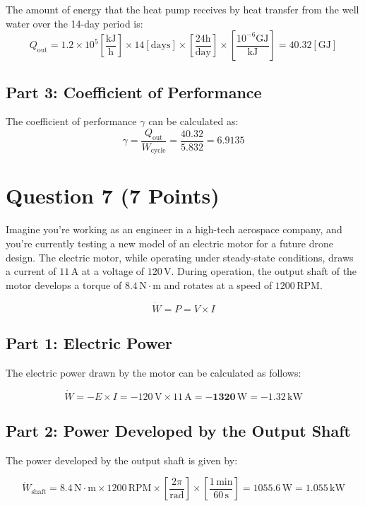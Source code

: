 \documentclass{article}
\begin{document}
The amount of energy that the heat pump receives by heat transfer from the well water over the 14-day period is:
\[
Q_{\text{out}} = 1.2\times{10}^5\left[\frac{\text{kJ}}{\text{h}}\right]\times 14\left[\text{days}\right]\times\left[\frac{24\text{h}}{\text{day}}\right]\times\left[\frac{{10}^{-6}\text{GJ}}{\text{kJ}}\right] = \mathbf{40.32}\left[\text{GJ}\right]
\]

\subsection*{Part 3: Coefficient of Performance}

The coefficient of performance \( \gamma \) can be calculated as:
\[
\gamma = \frac{Q_{\text{out}}}{W_{\text{cycle}}} = \frac{40.32}{5.832} = \mathbf{6.9135}
\]

\newpage
\section*{Question 7 (7 Points)}

Imagine you're working as an engineer in a high-tech aerospace company, and you're currently testing a new model of an electric motor for a future drone design. The electric motor, while operating under steady-state conditions, draws a current of \(11 \, \text{A}\) at a voltage of \(120 \, \text{V}\). During operation, the output shaft of the motor develops a torque of \(8.4 \, \text{N} \cdot \text{m}\) and rotates at a speed of \(1200 \, \text{RPM}\).

\[
\dot{W} = P = V \times I
\]

\subsection*{Part 1: Electric Power}

The electric power drawn by the motor can be calculated as follows:

\[
\dot{W} = -E \times I = -120 \, \text{V} \times 11 \, \text{A} = -\mathbf{1320} \, \text{W} = -\mathbf{1.32} \, \text{kW}
\]

\subsection*{Part 2: Power Developed by the Output Shaft}

The power developed by the output shaft is given by:

\[
\dot{W}_{\text{shaft}} = 8.4 \, \text{N} \cdot \text{m} \times 1200 \, \text{RPM} \times \left[\frac{2\pi}{\text{rad}}\right] \times \left[\frac{1 \, \text{min}}{60 \, \text{s}}\right] = \mathbf{1055.6} \, \text{W} = \mathbf{1.055} \, \text{kW}
\]
\end{document}
